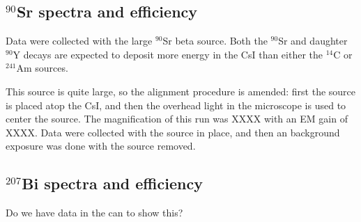 \documentclass[11pt]{article}
\newcommand{\nuc}[2]{\ensuremath{^{#1}}#2}
\begin{document}

\subsection{\nuc{90}{Sr} spectra and efficiency}
Data were collected with the large \nuc{90}{Sr} beta source. Both the \nuc{90}{Sr} and daughter \nuc{90}{Y} decays are expected to deposit more energy in the CsI than either the \nuc{14}{C} or \nuc{241}{Am} sources. 

This source is quite large, so the alignment procedure is amended: first the source is placed atop the CsI, and then the overhead light in the microscope is used to center the source. 
The magnification of this run was XXXX with an EM gain of XXXX. 
Data were collected with the source in place, and then an background exposure was done with the source removed. 

\subsection{\nuc{207}{Bi} spectra and efficiency}
 Do we have data in the can to show this? 
 
\end{document}

